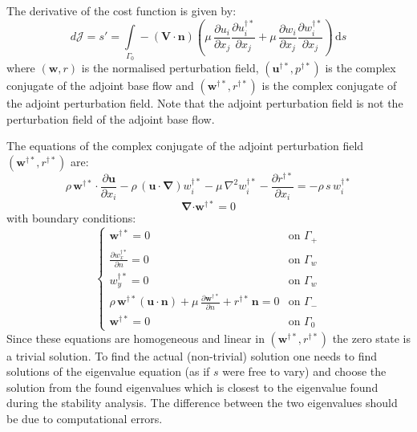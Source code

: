 \documentclass[12pt, a4paper]{article}
\begin{document}
    The derivative of the cost function is given by:
    \begin{equation}
    d \mathcal{J} = s' = \int\limits_{\Gamma_0} - (\mathbf{V \cdot n}) \left( 
    \mu \, \frac{\partial u_i}{\partial x_j} \frac{\partial u^{\dagger*}_i}{\partial x_j} + 
    \mu \, \frac{\partial w_i}{\partial x_j} \frac{\partial w^{\dagger*}_i}{\partial x_j}
    \right) \, \mathrm{d} s 
    \end{equation}
    where $(\mathbf{w},r)$ is the normalised perturbation field, $(\mathbf{u^{\dagger*}},p^{\dagger*})$ is the complex conjugate of the adjoint base flow and $(\mathbf{w^{\dagger*}},r^{\dagger*})$ is the complex conjugate of the adjoint perturbation field. Note that the adjoint perturbation field is not the perturbation field of the adjoint base flow.
    
    The equations of the complex conjugate of the adjoint perturbation field $(\mathbf{w^{\dagger*}},r^{\dagger*})$ are:
    \begin{equation}
    \rho \, \mathbf{w^{\dagger*} \cdot} \frac{\partial \mathbf{u}}{\partial x_i} - 
    \rho \, (\mathbf{u \cdot} \boldsymbol{\nabla}) w^{\dagger*}_i - 
    \mu \, \nabla^2 w^{\dagger*}_i - 
    \frac{\partial r^{\dagger*}}{\partial x_i} = 
    -\rho \, s \, w^{\dagger*}_i
    \end{equation}
    \begin{equation}
    \boldsymbol{\nabla} \mathbf{\cdot w^{\dagger*}} = 0
    \end{equation}
    with boundary conditions:
    \begin{equation}
    \begin{cases}
    \mathbf{w^{\dagger*}} = 0 & \text{on } \Gamma_+ \\
    \frac{\partial w^{\dagger*}_x}{\partial n} = 0 & \text{on } \Gamma_w \\
    w^{\dagger*}_y = 0 & \text{on } \Gamma_w \\
    \rho \, \mathbf{w^{\dagger*}} (\mathbf{u \cdot n}) + \mu \, \frac{\partial \mathbf{w^{\dagger*}}}{\partial n} + 
    r^{\dagger*} \, \mathbf{n} = 0 & \text{on } \Gamma_- \\
    \mathbf{w^{\dagger*}} = 0 & \text{on } \Gamma_0
    \end{cases}
    \end{equation}
    Since these equations are homogeneous and linear in $(\mathbf{w^{\dagger*}}, r^{\dagger*})$ the zero state is a trivial solution. To find the actual (non-trivial) solution one needs to find solutions of the eigenvalue equation (as if $s$ were free to vary) and choose the solution from the found eigenvalues which is closest to the eigenvalue found during the stability analysis. The difference between the two eigenvalues should be due to computational errors.
    
\end{document}
